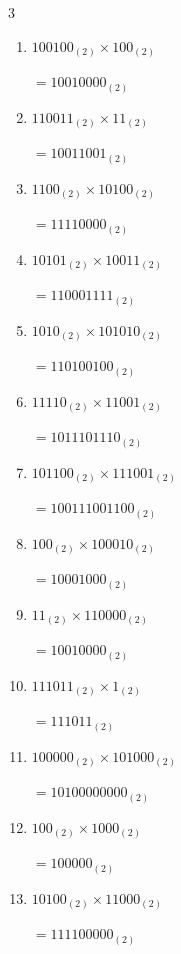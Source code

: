 \begin{multicols}{3}
\begin{enumerate}
\resetques

  \item $100100_{(2)} \times 100_{(2)}$

        $=10010000_{(2)}$

  \item $110011_{(2)} \times 11_{(2)}$

        $=10011001_{(2)}$

  \item $1100_{(2)} \times 10100_{(2)}$

        $=11110000_{(2)}$

  \item $10101_{(2)} \times 10011_{(2)}$

        $=110001111_{(2)}$

  \item $1010_{(2)} \times 101010_{(2)}$

        $=110100100_{(2)}$

\columnbreak %

  \item $11110_{(2)} \times 11001_{(2)}$

        $=1011101110_{(2)}$

  \item $101100_{(2)} \times 111001_{(2)}$

        $=100111001100_{(2)}$

  \item $100_{(2)} \times 100010_{(2)}$

        $=10001000_{(2)}$

  \item $11_{(2)} \times 110000_{(2)}$

        $=10010000_{(2)}$

  \item $111011_{(2)} \times 1_{(2)}$

        $=111011_{(2)}$

\columnbreak %

  \item $100000_{(2)} \times 101000_{(2)}$

        $=10100000000_{(2)}$

  \item $100_{(2)} \times 1000_{(2)}$

        $=100000_{(2)}$

  \item $10100_{(2)} \times 11000_{(2)}$

        $=111100000_{(2)}$


\end{enumerate}
\end{multicols}
